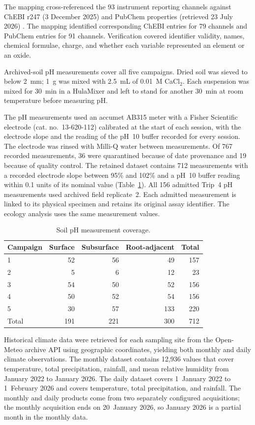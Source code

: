 \begin{revision}
The mapping cross-referenced the 93 instrument reporting channels against ChEBI r247 (3 December 2025) and PubChem properties (retrieved 23 July 2026) \cite{chebi,pubchem}. The mapping identified corresponding ChEBI entries for 79 channels and PubChem entries for 91 channels. Verification covered identifier validity, names, chemical formulae, charge, and whether each variable represented an element or an oxide.

\label{methods:ph}
Archived-soil pH measurements cover all five campaigns. Dried soil was sieved to below 2~mm; 1~g was mixed with 2.5~mL of 0.01~M CaCl$_2$. Each suspension was mixed for 30~min in a HulaMixer and left to stand for another 30~min at room temperature before measuring pH.

The pH measurements used an accumet AB315 meter with a Fisher Scientific electrode (cat. no.~13-620-112) calibrated at the start of each session, with the electrode slope and the reading of the pH~10 buffer recorded for every session. The electrode was rinsed with Milli-Q water between measurements. Of 767 recorded measurements, 36 were quarantined because of date provenance and 19 because of quality control. The retained dataset contains 712 measurements with a recorded electrode slope between 95\% and 102\% and a pH~10 buffer reading within 0.1 units of its nominal value (Table~\ref{tab:ph_coverage}). All 156 admitted Trip~4 pH measurements used archived field replicate~2. Each admitted measurement is linked to its physical specimen and retains its original assay identifier. The ecology analysis uses the same measurement values.

\begin{table}[h]
\centering
\caption{Soil pH measurement coverage.}
\label{tab:ph_coverage}
\small
\begin{tabular}{lrrrr}
\toprule
Campaign & Surface & Subsurface & Root-adjacent & Total \\
\midrule
1 & 52 & 56 & 49 & 157 \\
2 & 5 & 6 & 12 & 23 \\
3 & 54 & 50 & 52 & 156 \\
4 & 50 & 52 & 54 & 156 \\
5 & 30 & 57 & 133 & 220 \\
\midrule
Total & 191 & 221 & 300 & 712 \\
\bottomrule
\end{tabular}
\end{table}


Historical climate data were retrieved for each sampling site from the Open-Meteo archive API \cite{openmeteo} using geographic coordinates, yielding both monthly and daily climate observations. The monthly dataset contains 12,936 values that cover temperature, total precipitation, rainfall, and mean relative humidity from January 2022 to January 2026. The daily dataset covers 1~January 2022 to 1~February 2026 and covers temperature, total precipitation, and rainfall. The monthly and daily products come from two separately configured acquisitions; the monthly acquisition ends on 20~January 2026, so January 2026 is a partial month in the monthly data.


\end{revision}
